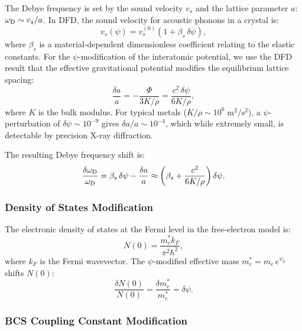 \documentclass[aps,prb,twocolumn,superscriptaddress,floatfix,nofootinbib,longbibliography]{revtex4-2}
\newcommand{\Phipot}{\Phi}
\newcommand{\wD}{\omega_{\rm D}}
\begin{document}
The Debye frequency is set by the sound velocity $v_s$ and the lattice
parameter $a$: $\wD \sim v_s/a$.  In DFD, the sound velocity for
acoustic phonons in a crystal is:
\begin{equation}
v_s(\psi) = v_s^{(0)}\left(1 + \beta_s\,\delta\psi\right),
\label{eq:vs-psi}
\end{equation}
where $\beta_s$ is a material-dependent dimensionless coefficient
relating to the elastic constants.  For the $\psi$-modification of the
interatomic potential, we use the DFD result that the effective
gravitational potential modifies the equilibrium lattice spacing:
\begin{equation}
\frac{\delta a}{a} = -\frac{\Phipot}{3K/\rho} = \frac{c^2\,\delta\psi}{6K/\rho},
\label{eq:lattice-shift}
\end{equation}
where $K$ is the bulk modulus.  For typical metals
($K/\rho \sim 10^6\;\text{m}^2/\text{s}^2$), a $\psi$-perturbation of
$\delta\psi \sim 10^{-9}$ gives $\delta a/a \sim 10^{-4}$, which while
extremely small, is detectable by precision X-ray diffraction.

The resulting Debye frequency shift is:
\begin{equation}
\frac{\delta\wD}{\wD} = \beta_s\,\delta\psi - \frac{\delta a}{a}
\approx \left(\beta_s + \frac{c^2}{6K/\rho}\right)\delta\psi.
\label{eq:debye-shift}
\end{equation}

\subsubsection{Density of States Modification}

The electronic density of states at the Fermi level in the free-electron
model is:
\begin{equation}
N(0) = \frac{m_e^* k_F}{\pi^2\hbar^2},
\label{eq:N0}
\end{equation}
where $k_F$ is the Fermi wavevector.  The $\psi$-modified effective mass
$m_e^* = m_e\,e^{\psi_0}$ shifts $N(0)$:
\begin{equation}
\frac{\delta N(0)}{N(0)} = \frac{\delta m_e^*}{m_e^*} = \delta\psi.
\label{eq:N0-shift}
\end{equation}

\subsubsection{BCS Coupling Constant Modification}
\end{document}
